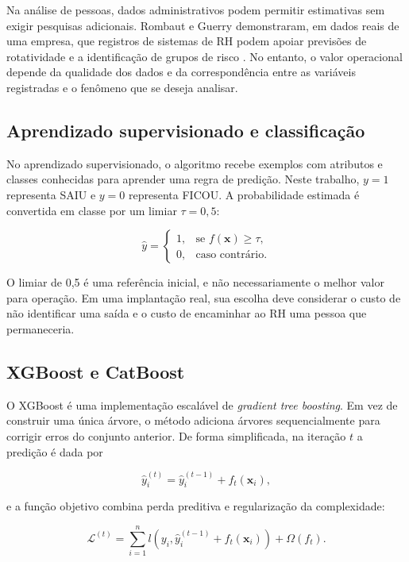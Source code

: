 \documentclass[12pt]{article}
\begin{document}
Na análise de pessoas, dados administrativos podem permitir estimativas sem exigir pesquisas adicionais. Rombaut e Guerry demonstraram, em dados reais de uma empresa, que registros de sistemas de RH podem apoiar previsões de rotatividade e a identificação de grupos de risco \cite{rombaut2018predicting}. No entanto, o valor operacional depende da qualidade dos dados e da correspondência entre as variáveis registradas e o fenômeno que se deseja analisar.

\subsection{Aprendizado supervisionado e classificação}

No aprendizado supervisionado, o algoritmo recebe exemplos com atributos e classes conhecidas para aprender uma regra de predição. Neste trabalho, $y=1$ representa SAIU e $y=0$ representa FICOU. A probabilidade estimada é convertida em classe por um limiar $\tau=0{,}5$:

\begin{equation}
\widehat{y}=\begin{cases}
1, & \text{se } f(\mathbf{x})\geq \tau,\\
0, & \text{caso contrário.}
\end{cases}
\end{equation}

O limiar de 0,5 é uma referência inicial, e não necessariamente o melhor valor para operação. Em uma implantação real, sua escolha deve considerar o custo de não identificar uma saída e o custo de encaminhar ao RH uma pessoa que permaneceria.

\subsection{XGBoost e CatBoost}

O XGBoost é uma implementação escalável de \textit{gradient tree boosting}. Em vez de construir uma única árvore, o método adiciona árvores sequencialmente para corrigir erros do conjunto anterior. De forma simplificada, na iteração $t$ a predição é dada por

\begin{equation}
\widehat{y}^{(t)}_i=\widehat{y}^{(t-1)}_i+f_t(\mathbf{x}_i),
\end{equation}

e a função objetivo combina perda preditiva e regularização da complexidade:

\begin{equation}
\mathcal{L}^{(t)}=\sum_{i=1}^{n}l\left(y_i,\widehat{y}^{(t-1)}_i+f_t(\mathbf{x}_i)\right)+\Omega(f_t).
\end{equation}
\end{document}
